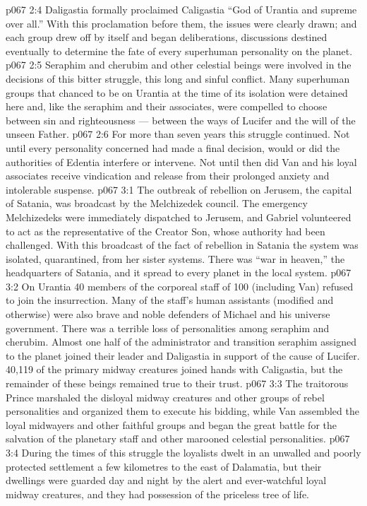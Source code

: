 \vs p067 2:4 \pc Daligastia formally proclaimed Caligastia “God of Urantia and supreme over all.” With this proclamation before them, the issues were clearly drawn; and each group drew off by itself and began deliberations, discussions destined eventually to determine the fate of every superhuman personality on the planet.
\vs p067 2:5 Seraphim and cherubim and other celestial beings were involved in the decisions of this bitter struggle, this long and sinful conflict. Many superhuman groups that chanced to be on Urantia at the time of its isolation were detained here and, like the seraphim and their associates, were compelled to choose between sin and righteousness --- between the ways of Lucifer and the will of the unseen Father.
\vs p067 2:6 For more than seven years this struggle continued. Not until every personality concerned had made a final decision, would or did the authorities of Edentia interfere or intervene. Not until then did Van and his loyal associates receive vindication and release from their prolonged anxiety and intolerable suspense.
\vs p067 3:1 The outbreak of rebellion on Jerusem, the capital of Satania, was broadcast by the Melchizedek council. The emergency Melchizedeks were immediately dispatched to Jerusem, and Gabriel volunteered to act as the representative of the Creator Son, whose authority had been challenged. With this broadcast of the fact of rebellion in Satania the system was isolated, quarantined, from her sister systems. There was “war in heaven,” the headquarters of Satania, and it spread to every planet in the local system.
\vs p067 3:2 On Urantia 40 members of the corporeal staff of 100 (including Van) refused to join the insurrection. Many of the staff’s human assistants (modified and otherwise) were also brave and noble defenders of Michael and his universe government. There was a terrible loss of personalities among seraphim and cherubim. Almost one half of the administrator and transition seraphim assigned to the planet joined their leader and Daligastia in support of the cause of Lucifer. 40,119 of the primary midway creatures joined hands with Caligastia, but the remainder of these beings remained true to their trust.
\vs p067 3:3 The traitorous Prince marshaled the disloyal midway creatures and other groups of rebel personalities and organized them to execute his bidding, while Van assembled the loyal midwayers and other faithful groups and began the great battle for the salvation of the planetary staff and other marooned celestial personalities.
\vs p067 3:4 During the times of this struggle the loyalists dwelt in an unwalled and poorly protected settlement a few kilometres to the east of Dalamatia, but their dwellings were guarded day and night by the alert and ever\hyp{}watchful loyal midway creatures, and they had possession of the priceless tree of life.
